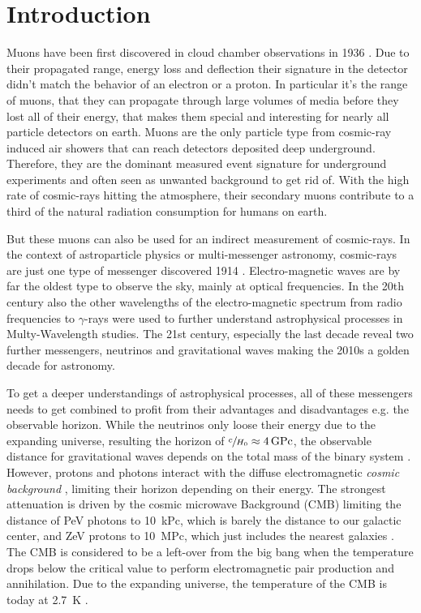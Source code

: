 \chapter{Introduction}

Muons have been first discovered in cloud chamber observations in 1936 \cite{Anderson36Muon}.
Due to their propagated range, energy loss and deflection their signature in the detector didn't match the behavior of an electron or a proton.
In particular it's the range of muons, that they can propagate through large volumes of media before they lost all of their energy, that makes them special and interesting for nearly all particle detectors on earth.
Muons are the only particle type from cosmic-ray induced air showers that can reach detectors deposited deep underground.
Therefore, they are the dominant measured event signature for underground experiments and often seen as unwanted background to get rid of.
With the high rate of cosmic-rays hitting the atmosphere, their secondary muons contribute to a third of the natural radiation consumption for humans on earth.

But these muons can also be used for an indirect measurement of cosmic-rays.
In the context of astroparticle physics or multi-messenger astronomy, cosmic-rays are just one type of messenger discovered 1914 \cite{Hess12CRbirth}.
Electro-magnetic waves are by far the oldest type to observe the sky, mainly at optical frequencies.
In the 20th century also the other wavelengths of the electro-magnetic spectrum from radio frequencies to $\gamma$-rays were used to further understand astrophysical processes in Multy-Wavelength studies.
The 21st century, especially the last decade reveal two further messengers, neutrinos and gravitational waves making the 2010s a golden decade for astronomy.

To get a deeper understandings of astrophysical processes, all of these messengers needs to get combined to profit from their advantages and disadvantages e.g. the observable horizon.
While the neutrinos only loose their energy due to the expanding universe, resulting the horizon of $\sfrac{c}{H_0}\approx\SI{4}{GPc}$, the observable distance for gravitational waves depends on the total mass of the binary system \cite{LIGO20WhitePaper}.
However, protons and photons interact with the diffuse electromagnetic \textit{cosmic background} \cite{Hill18CosmicBg}, limiting their horizon depending on their energy.
The strongest attenuation is driven by the cosmic microwave Background (CMB) limiting the distance of PeV photons to \SI{10}{kPc}, which is barely the distance to our galactic center, and ZeV protons to \SI{10}{MPc}, which just includes the nearest galaxies \cite{DeAngelis13Horizon}.
The CMB is considered to be a left-over from the big bang when the temperature drops below the critical value to perform electromagnetic pair production and annihilation.
Due to the expanding universe, the temperature of the CMB is today at \SI{2.7}{K} \cite{PDG20}.

